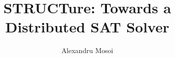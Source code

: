 \documentclass[a4paper]{report}
\begin{document}
\title{STRUCTure: Towards a Distributed SAT Solver}
\author{Alexandru Mosoi}

\maketitle
\tableofcontents













\appendix


\end{document}
